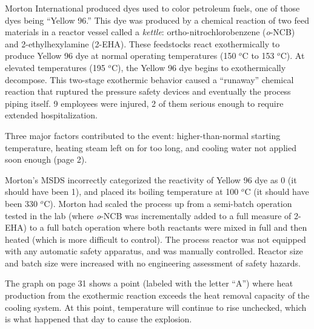 












Morton International produced dyes used to color petroleum fuels, one of those dyes being ``Yellow 96.''  This dye was produced by a chemical reaction of two feed materials in a reactor vessel called a {\it kettle}: ortho-nitrochlorobenzene ({\it o}-NCB) and 2-ethylhexylamine (2-EHA).  These feedstocks react exothermically to produce Yellow 96 dye at normal operating temperatures (150 $^{o}$C to 153 $^{o}$C).  At elevated temperatures (195 $^{o}$C), the Yellow 96 dye begins to exothermically decompose.  This two-stage exothermic behavior caused a ``runaway'' chemical reaction that ruptured the pressure safety devices and eventually the process piping itself.  9 employees were injured, 2 of them serious enough to require extended hospitalization.

Three major factors contributed to the event: higher-than-normal starting temperature, heating steam left on for too long, and cooling water not applied soon enough (page 2).

\vskip 10pt

Morton's MSDS incorrectly categorized the reactivity of Yellow 96 dye as 0 (it should have been 1), and placed its boiling temperature at 100 $^{o}$C (it should have been 330 $^{o}$C).  Morton had scaled the process up from a semi-batch operation tested in the lab (where {\it o}-NCB was incrementally added to a full measure of 2-EHA) to a full batch operation where both reactants were mixed in full and then heated (which is more difficult to control).  The process reactor was not equipped with any automatic safety apparatus, and was manually controlled.  Reactor size and batch size were increased with no engineering assessment of safety hazards.

\vskip 10pt

The graph on page 31 shows a point (labeled with the letter ``A'') where heat production from the exothermic reaction exceeds the heat removal capacity of the cooling system.  At this point, temperature will continue to rise unchecked, which is what happened that day to cause the explosion.

\vskip 10pt

